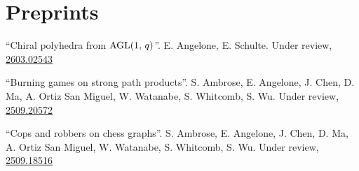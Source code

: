 \section*{Preprints}
``Chiral polyhedra from $\operatorname{AGL}(1,\, q)$''. {\color{GriffinGreyBold}E. Angelone}, E. Schulte. Under review, \href{https://arxiv.org/abs/2603.02543}{\ul{2603.02543}\link}
\smallskip

``Burning games on strong path products''. S. Ambrose, {\color{GriffinGreyBold}E. Angelone}, J. Chen, D. Ma, A. Ortiz San Miguel, W. Watanabe, S. Whitcomb, S. Wu. Under review, \href{https://arxiv.org/abs/2509.20572}{\ul{2509.20572}\link}
\smallskip

``Cops and robbers on chess graphs''. S. Ambrose, {\color{GriffinGreyBold}E. Angelone}, J. Chen, D. Ma, A. Ortiz San Miguel, W. Watanabe, S. Whitcomb, S. Wu. Under review, \href{https://arxiv.org/abs/2509.18516}{\ul{2509.18516}\link}